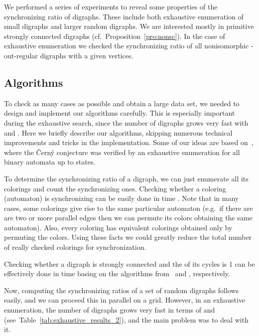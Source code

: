 \documentclass[runningheads]{llncs}
\begin{document}
We performed a series of experiments to reveal some properties of the synchronizing ratio of digraphs. These include both exhaustive enumeration of small digraphs and larger random digraphs.
We are interested mostly in primitive strongly connected digraphs (cf.~Proposition~\ref{pro:nonsc}).
In the case of exhaustive enumeration we checked the synchronizing ratio of all nonisomorphic -out-regular digraphs with a given  vertices.

\subsection{Algorithms}

To check as many cases as possible and obtain a large data set, we needed to design and implement our algorithms carefully.
This is especially important during the exhaustive search, since the number of digraphs grows very fast with  and .
Here we briefly describe our algorithms, skipping numerous technical improvements and tricks in the implementation.
Some of our ideas are based on~\cite{KS2013GeneratingSmallAutomata}, where the \v{C}ern\'{y} conjecture was verified by an exhaustive enumeration for all binary automata up to  states.

To determine the synchronizing ratio of a digraph, we can just enumerate all its colorings and count the synchronizing ones.
Checking whether a coloring (automaton) is synchronizing can be easily done in  time \cite{Cerny1964,Ep1990}.
Note that in many cases, some colorings give rise to the same particular automaton (e.g.~if there are are two or more parallel edges  then we can permute its colors obtaining the same automaton).
Also, every coloring has  equivalent colorings obtained only by permuting the colors. Using these facts we could greatly reduce the total number of really checked colorings for synchronization.

Checking whether a digraph is strongly connected and the  of its cycles is 1 can be effectively done in  time basing on the algorithms from~\cite{Tarjan1972} and \cite{JS1996GraphTheoreticAnalysisOfMarkovChains}, respectively.

Now, computing the synchronizing ratios of a set of random digraphs follows easily, and we can proceed this in parallel on a grid.
However, in an exhaustive enumeration, the number of digraphs grows very fast in terms of  and  (see~Table~\ref{tab:exhaustive_results_2}), and the main problem was to deal with it.
\end{document}
